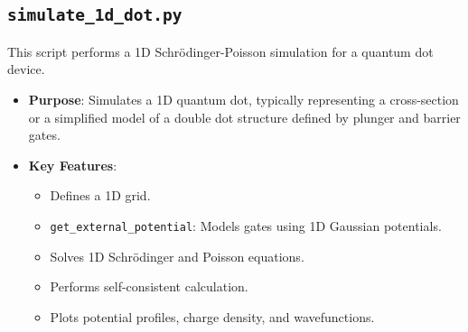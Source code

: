 \documentclass{article}
\begin{document}
\subsection{\texttt{simulate\_1d\_dot.py}}
This script performs a 1D Schrödinger-Poisson simulation for a quantum dot device.
\begin{itemize}
	\item \textbf{Purpose}: Simulates a 1D quantum dot, typically representing a cross-section or a simplified model of a double dot structure defined by plunger and barrier gates.
	\item \textbf{Key Features}:
	      \begin{itemize}
		      \item Defines a 1D grid.
		      \item \texttt{get\_external\_potential}: Models gates using 1D Gaussian potentials.
		      \item Solves 1D Schrödinger and Poisson equations.
		      \item Performs self-consistent calculation.
		      \item Plots potential profiles, charge density, and wavefunctions.
	      \end{itemize}
\end{itemize}
\end{document}
